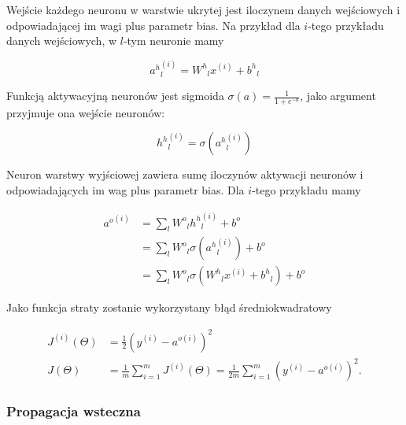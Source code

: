 \documentclass[11pt]{book}
\theoremstyle{definition}
\begin{document}
Wejście każdego neuronu w warstwie ukrytej jest iloczynem danych wejściowych i odpowiadającej im wagi plus parametr bias. Na przykład dla $i$-tego przykładu danych wejściowych, w $l$-tym neuronie mamy

\begin{equation}
{a^h}^{(i)}_l = {W^h}_{l}x^{(i)} + {b^h}_l
\end{equation}




Funkcją aktywacyjną neuronów jest sigmoida $\sigma(a) = \frac{1}{1+e^{-a}}$, jako argument przyjmuje ona wejście neuronów:

\begin{equation}
{h^h}^{(i)}_l=\sigma({a^h}^{(i)}_l)
\end{equation}


Neuron warstwy wyjściowej zawiera sumę iloczynów aktywacji neuronów i odpowiadających im wag plus parametr bias. Dla $i$-tego przykładu mamy

\begin{equation}
\begin{split}
{a^o}^{(i)} &= \sum_{l} {W^o}_l{h^h}^{(i)}_l + {b^o} \\
& = \sum_{l} {W^o}_l\sigma({a^h}^{(i)}_l) + {b^o} \\
& = \sum_{l} {W^o}_l\sigma({W^h}_{l}x^{(i)} + {b^h}_l) + {b^o}
\end{split}
\end{equation}

Jako funkcja straty zostanie wykorzystany błąd średniokwadratowy

\begin{equation}
\begin{split}
J^{(i)}(\Theta) &= \frac{1}{2} \left( y^{(i)}- a^{o{(i)}}  \right)  ^2 \\
J(\Theta) &= \frac{1}{m}\sum_{i=1}^m J^{(i)}(\Theta)= \frac{1}{2m}\sum_{i=1}^m \left( y^{(i)}- a^{o{(i)}}  \right)  ^2  .
\end{split}
\end{equation}


\subsubsection{Propagacja wsteczna}
\end{document}
